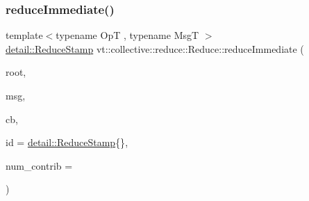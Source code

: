 \subsubsection{\texorpdfstring{reduce\+Immediate()}{reduceImmediate()}\hspace{0.1cm}{\footnotesize\ttfamily [4/8]}}
{\footnotesize\ttfamily template$<$typename OpT , typename MsgT $>$ \\
\hyperlink{namespacevt_1_1collective_1_1reduce_1_1detail_aacc1fcd729d934ba143fee3a943bf9e7}{detail\+::\+Reduce\+Stamp} vt\+::collective\+::reduce\+::\+Reduce\+::reduce\+Immediate (\begin{DoxyParamCaption}\item[{\hyperlink{namespacevt_a866da9d0efc19c0a1ce79e9e492f47e2}{Node\+Type} const \&}]{root,  }\item[{MsgT $\ast$}]{msg,  }\item[{\hyperlink{namespacevt_a57b238783d05de96bc2c4027f7073b7f}{Callback}$<$ MsgT $>$}]{cb,  }\item[{\hyperlink{namespacevt_1_1collective_1_1reduce_1_1detail_aacc1fcd729d934ba143fee3a943bf9e7}{detail\+::\+Reduce\+Stamp}}]{id = {\ttfamily \hyperlink{namespacevt_1_1collective_1_1reduce_1_1detail_aacc1fcd729d934ba143fee3a943bf9e7}{detail\+::\+Reduce\+Stamp}\{\}},  }\item[{\hyperlink{structvt_1_1collective_1_1reduce_1_1_reduce_a6c3e63aca10c31d2823b0b18cf9762a4}{Reduce\+Num\+Type} const \&}]{num\+\_\+contrib = {} }\end{DoxyParamCaption})\hspace{0.3cm}{\ttfamily [inline]}}

\mbox{\label{structvt_1_1collective_1_1reduce_1_1_reduce_aa67345409ff38a10715ee87821b02e10}} 
